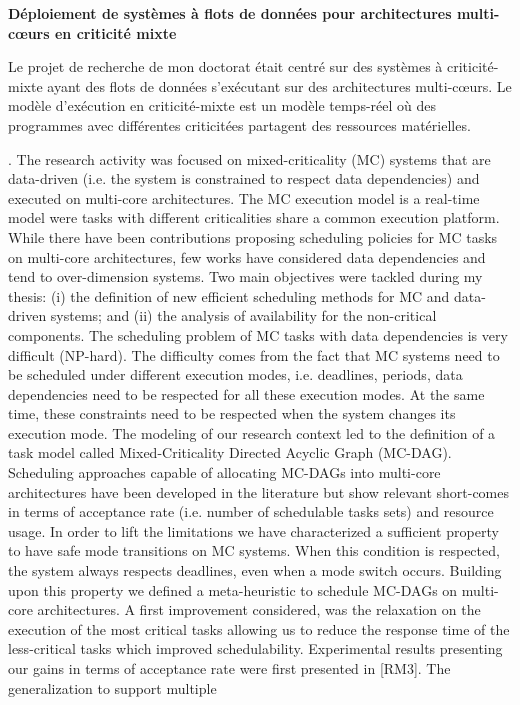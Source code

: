 \documentclass{article}
\begin{document}
\textbf{Déploiement de systèmes à flots de données pour architectures multi-c\oe{}urs en criticité mixte}

Le projet de recherche de mon doctorat était centré sur des systèmes à criticité-mixte ayant des flots de 
données s'exécutant sur des architectures multi-c\oe{}urs. Le modèle d'exécution en criticité-mixte est un 
modèle temps-réel où des programmes avec différentes criticitées partagent des ressources matérielles.

. The
research activity was focused on mixed-criticality (MC) systems that are data-driven (i.e. the system is 
constrained to
respect data dependencies) and executed on multi-core architectures. The MC execution model is a 
real-time model were
tasks with different criticalities share a common execution platform.  While there have been 
contributions
proposing scheduling policies for MC tasks on multi-core architectures, few works have considered data 
dependencies
and tend to over-dimension systems. Two main objectives were tackled during my thesis: (i) the definition of 
new efficient
scheduling methods for MC and data-driven systems; and (ii) the analysis of availability for the non-critical 
components.
The scheduling problem of MC tasks with data dependencies is very difficult (NP-hard). The difficulty comes 
from the
fact that MC systems need to be scheduled under different execution modes, i.e. deadlines, periods, data 
dependencies
need to be respected for all these execution modes. At the same time, these constraints need to be respected 
when the
system changes its execution mode. The modeling of our research context led to the definition of a task 
model called
Mixed-Criticality Directed Acyclic Graph (MC-DAG). Scheduling approaches capable of allocating MC-DAGs 
into multi-core
architectures have been developed in the literature but show relevant short-comes in terms of acceptance 
rate (i.e. number
of schedulable tasks sets) and resource usage. In order to lift the limitations we have characterized a 
sufficient property to
have safe mode transitions on MC systems. When this condition is respected, the system always respects 
deadlines, even
when a mode switch occurs. Building upon this property we defined a meta-heuristic to schedule MC-DAGs 
on multi-core
architectures. A first improvement considered, was the relaxation on the execution of the most critical tasks 
allowing us to
reduce the response time of the less-critical tasks which improved schedulability. Experimental results 
presenting our gains
in terms of acceptance rate were first presented in [RM3]. The generalization to support multiple 
\end{document}
